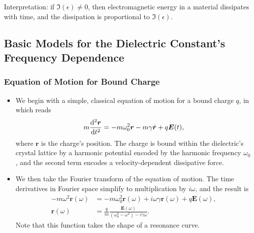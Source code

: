 \documentclass[11pt, a4paper]{article}
\renewcommand{\vec}[1]{\bm{#1}} %
\renewcommand{\r}{\vec{r}}
\newcommand{\E}{\vec{E}} %
\begin{document}
\begin{itemize}
    Interpretation: if $ \Im(\epsilon) \neq 0 $, then electromagnetic energy in a material dissipates with time, and the dissipation is proportional to $ \Im(\epsilon) $.

\end{itemize}
    
\subsection{Basic Models for the Dielectric Constant's Frequency Dependence}

\subsubsection{Equation of Motion for Bound Charge}
\begin{itemize}

    \item We begin with a simple, classical equation of motion for a bound charge $ q $, in which reads
    \begin{equation*}
        m \dv[2]{\r}{t} = - m \omega_{0}^{2}\r - m\gamma \dot{\r} + q\E(t),
    \end{equation*}
    where $ \r $ is the charge's position. The charge is bound within the dielectric's crystal lattice by a harmonic potential encoded by the harmonic frequency $ \omega_{0} $, and the second term encodes a velocity-dependent dissipative force. 

    \item We then take the Fourier transform of the equation of motion. The time derivatives in Fourier space simplify to multiplication by $ i\omega $, and the result is
    \begin{align*}
        -m\omega^{2}\r(\omega) &= - m\omega_{0}^{2}\r(\omega) + i\omega\gamma\r(\omega) + q\E(\omega),\\
        \r(\omega) &= \frac{q}{m} \frac{\E(\omega)}{(\omega_{0}^{2} - \omega^{2}) - i \gamma\omega}.
    \end{align*}
    Note that this function takes the shape of a resonance curve. 


\end{itemize}
\end{document}
